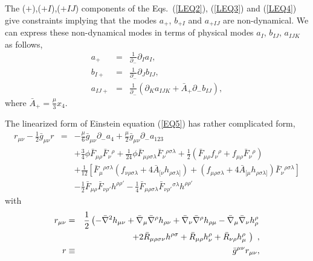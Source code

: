 \documentclass[a4paper,12pt]{article}
\numberwithin{equation}{section}
\begin{document}
The ($+$),($+I$),($+IJ$) components of the Eqs.~(\ref{LEQ2}),
(\ref{LEQ3}) and (\ref{LEQ4}) give constraints implying that the modes
$a_+$, $b_{+I}$ and $a_{+IJ}$ are non-dynamical.  We can express these
non-dynamical modes in terms of physical modes $a_I$, $b_{IJ}$,
$a_{IJK}$ as follows,
\begin{eqnarray}
a_+ &=& \frac1{\partial_-}\partial_I a_I,\label{const1} \\
b_{I+} &=& \frac1{\partial_-}\partial_J b_{IJ}, \label{const2} \\
a_{IJ+} &=& \frac1{\partial_-} \left( \partial_K a_{IJK}
            + \bar A_+\partial_- b_{IJ}\right), \label{const3}
\end{eqnarray}
where $\bar A_+ = \frac{\mu}3 x_4$.

The linearized form of Einstein equation (\ref{EQ5}) has rather
complicated form,
\begin{eqnarray}
r_{\mu\nu} - \frac12 \bar g_{\mu\nu} r
  &=& - \frac{\mu}6 \bar{g}_{\mu\nu} \partial_- a_4
      + \frac{\mu}2 \bar{g}_{\mu\nu} \partial_- a_{123}
\nonumber \\
  & & + \frac34 \phi \bar{F}_{\mu\rho} \bar{F}_\nu{}^\rho
      + \frac1{24} \phi \bar{F}_{\mu\rho\sigma\lambda}
          \bar{F}_\nu{}^{\rho\sigma\lambda}
      + \frac12 \left( \bar{F}_{\mu\rho} f_\nu{}^\rho
                      + f_{\mu\rho} \bar{F}_\nu{}^\rho
                \right)
\nonumber \\
  & & + \frac1{12}
        \left[ \bar{F}_\mu{}^{\rho\sigma\lambda}
               \left( f_{\nu\rho\sigma\lambda}
                     + 4 \bar{A}_{[\nu} h_{\rho\sigma\lambda]}
               \right)
             + \left( f_{\mu\rho\sigma\lambda}
                     + 4 \bar{A}_{[\mu} h_{\rho\sigma\lambda]}
               \right)
               \bar{F}_\nu{}^{\rho\sigma\lambda} \right]
\nonumber \\
  & & - \frac12 \bar{F}_{\mu\rho}
              \bar{F}_{\nu\rho'} h^{\rho\rho'}
      - \frac14 \bar{F}_{\mu\rho\sigma\lambda}
                \bar{F}_{\nu\rho'}{}^{\sigma\lambda}
                h^{\rho\rho'}
\label{LEQ5}
\end{eqnarray}
with
\begin{eqnarray}
r_{\mu\nu} &=&
      \frac12
      \left( -\bar \nabla^2 h_{\mu\nu}
           +\bar \nabla_\mu \bar\nabla^\rho h_{\rho\nu}
           + \bar\nabla_\nu \bar \nabla^\rho h_{\rho\mu}
           - \bar\nabla_\mu \bar\nabla_\nu h^\rho_{\rho}
      \right.
\nonumber \\
&& \hskip 5mm
  \left.
            + 2 \bar R_{\mu\rho\sigma\nu} h^{\rho\sigma}
            + \bar R_{\mu\rho} h^\rho_\nu
            + \bar R_{\nu\rho} h^\rho_\mu ~
  \right) ~,
\label{flucR} \\
r &\equiv& \bar g^{\mu\nu} r_{\mu\nu}, \label{flucRR}
\end{eqnarray}
\end{document}
